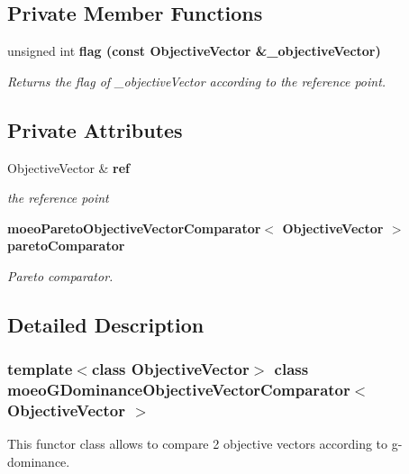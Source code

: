 \subsection*{Private Member Functions}
\begin{CompactItemize}
\item 
unsigned int \bf{flag} (const Objective\-Vector \&\_\-objective\-Vector)
\begin{CompactList}\small\item\em Returns the flag of \_\-objective\-Vector according to the reference point. \item\end{CompactList}\end{CompactItemize}
\subsection*{Private Attributes}
\begin{CompactItemize}
\item 
Objective\-Vector \& \bf{ref}\label{classmoeoGDominanceObjectiveVectorComparator_54cf089933c4d5d70ceb931c2b97ca68}

\begin{CompactList}\small\item\em the reference point \item\end{CompactList}\item 
\bf{moeo\-Pareto\-Objective\-Vector\-Comparator}$<$ Objective\-Vector $>$ \bf{pareto\-Comparator}\label{classmoeoGDominanceObjectiveVectorComparator_5768e6444e546f1da2f36ccabcfc1f70}

\begin{CompactList}\small\item\em Pareto comparator. \item\end{CompactList}\end{CompactItemize}


\subsection{Detailed Description}
\subsubsection*{template$<$class Objective\-Vector$>$ class moeo\-GDominance\-Objective\-Vector\-Comparator$<$ Objective\-Vector $>$}

This functor class allows to compare 2 objective vectors according to g-dominance. 

